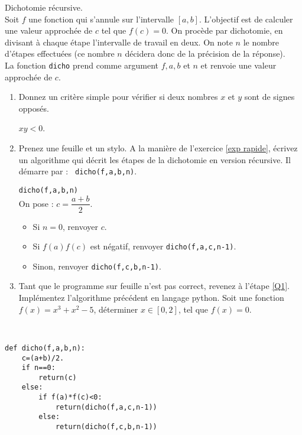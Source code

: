 \begin{exercice}Dichotomie récursive.\\
Soit $f$ une fonction qui s'annule sur l'intervalle $[a,b]$. L'objectif est de calculer une valeur approchée de $c$ tel que $f(c)=0$. On procède par dichotomie, en divisant à chaque étape l'intervalle de travail en deux. On note $n$ le nombre d'étapes effectuées (ce nombre $n$ décidera donc de la précision de la réponse).\\
La fonction \verb?dicho? prend comme argument $f,a,b$ et $n$ et renvoie une valeur approchée de $c$.
\begin{enumerate}
\item Donnez un critère simple pour vérifier si deux nombres $x$ et $y$ sont de signes opposés.
\begin{solution}
$xy<0$.
\end{solution}
\item \label{Q1} Prenez une feuille et un stylo. A la manière de l'exercice \ref{exp rapide}, écrivez un algorithme qui décrit les étapes de la dichotomie en version récursive. Il démarre par : \verb? dicho(f,a,b,n)?.
\begin{solution}
\verb?dicho(f,a,b,n)?\\
On pose : $c=\dfrac{a+b}{2}$.
\begin{itemize}
\item Si $n=0$, renvoyer $c$.
\item Si $f(a)f(c)$ est négatif, renvoyer \verb?dicho(f,a,c,n-1)?.
\item Sinon, renvoyer \verb?dicho(f,c,b,n-1)?.
\end{itemize}
\end{solution}
\item Tant que le programme sur feuille n'est pas correct, revenez à l'étape \ref{Q1}.  \\
Implémentez l'algorithme précédent en langage python. Soit une fonction $f(x)=x^3+x^2-5$, déterminer $x\in[0,2]$, tel que  $f(x)=0$.
\end{enumerate}
\end{exercice}
\begin{solution}~\\
\vspace{-0.7cm}
\begin{verbatim}
def dicho(f,a,b,n):
    c=(a+b)/2.
    if n==0:
        return(c)
    else:
        if f(a)*f(c)<0:
            return(dicho(f,a,c,n-1))
        else:
            return(dicho(f,c,b,n-1))
\end{verbatim}
\end{solution}






